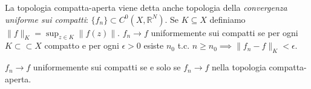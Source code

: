 La topologia compatta-aperta viene detta anche topologia della \textit{convergenza uniforme sui compatti}: $\{f_n\} \subset C^0(X, \mathbb{R}^N)$. Se $K \subseteq X$ definiamo $\displaystyle \|f\|_K=\sup_{z \in K} \|f(z)\|$.
$f_n \longrightarrow f$ uniformemente sui compatti se per ogni $K \subset \subset X$ compatto e per ogni $\epsilon>0$ esiste $n_0$ t.c. $n \ge n_0 \implies \|f_n-f\|_K<\epsilon$.

\begin{exc}
  $f_n \longrightarrow f$ uniformemente sui compatti se e solo se $f_n \longrightarrow f$ nella topologia compatta-aperta.
\end{exc}
